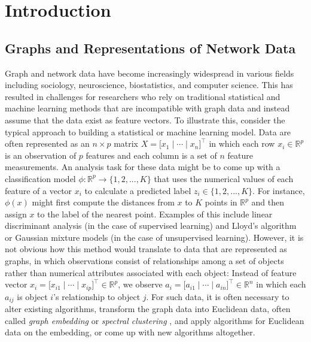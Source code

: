 \documentclass[
  12pt,
]{article}
\theoremstyle{definition}
\theoremstyle{definition}
\theoremstyle{definition}
\theoremstyle{definition}
\theoremstyle{remark}
\begin{document}
\newpage

\hypertarget{introduction}{%
\section{Introduction}\label{introduction}}

\hypertarget{graphs-and-representations-of-network-data}{%
\subsection{Graphs and Representations of Network Data}\label{graphs-and-representations-of-network-data}}

Graph and network data have become increasingly widespread in various fields including sociology, neuroscience, biostatistics, and computer science.
This has resulted in challenges for researchers who rely on traditional statistical and machine learning methods that are incompatible with graph data and instead assume that the data exist as feature vectors.
To illustrate this, consider the typical approach to building a statistical or machine learning model.
Data are often represented as an \(n \times p\) matrix \(X = \Big[ x_1 \mid \cdots \mid x_n \Big]^\top\) in which each row \(x_i \in \mathbb{R}^p\) is an observation of \(p\) features and each column is a set of \(n\) feature measurements.
An analysis task for these data might be to come up with a classification model \(\phi : \mathbb{R}^p \to \{1, 2, ..., K\}\) that uses the numerical values of each feature of a vector \(x_i\) to calculate a predicted label \(z_i \in \{1, 2, ..., K\}\).
For instance, \(\phi(x)\) might first compute the distances from \(x\) to \(K\) points in \(\mathbb{R}^p\) and then assign \(x\) to the label of the nearest point.
Examples of this include linear discriminant analysis (in the case of supervised learning) and Lloyd's algorithm \citep{1056489} or Gaussian mixture models \citep{doi:10.1198/016214502760047131} (in the case of unsupervised learning).
However, it is not obvious how this method would translate to data that are represented as graphs, in which observations consist of relationships among a set of objects rather than numerical attributes associated with each object:
Instead of feature vector \(x_i = \Big[ x_{i1} \mid \cdots \mid x_{ip} \Big]^\top \in \mathbb{R}^p\), we observe \(a_i = \Big[ a_{i1} \mid \cdots \mid a_{in} \Big]^\top \in \mathbb{R}^n\) in which each \(a_{ij}\) is object \(i\)'s relationship to object \(j\).
For such data, it is often necessary to alter existing algorithms, transform the graph data into Euclidean data, often called \emph{graph embedding} or \emph{spectral clustering} \citep{vonLuxburg2007}, and apply algorithms for Euclidean data on the embedding, or come up with new algorithms altogether.
\end{document}
